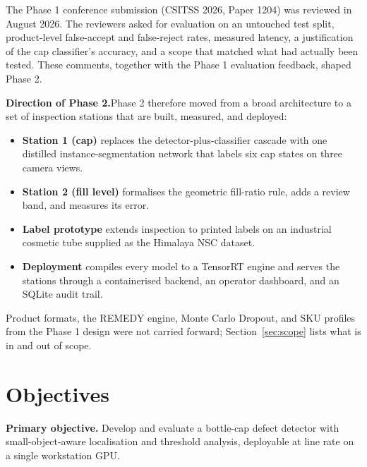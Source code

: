 The Phase 1 conference submission (CSITSS 2026, Paper 1204) was reviewed in August 2026. The reviewers asked for evaluation on an untouched test split, product-level false-accept and false-reject rates, measured latency, a justification of the cap classifier's accuracy, and a scope that matched what had actually been tested. These comments, together with the Phase 1 evaluation feedback, shaped Phase 2.

\noindent\textbf{Direction of Phase 2.}Phase 2 therefore moved from a broad architecture to a set of inspection stations that are built, measured, and deployed:
\begin{itemize}
    \item \textbf{Station 1 (cap)} replaces the detector-plus-classifier cascade with one distilled instance-segmentation network that labels six cap states on three camera views.
    \item \textbf{Station 2 (fill level)} formalises the geometric fill-ratio rule, adds a review band, and measures its error.
    \item \textbf{Label prototype} extends inspection to printed labels on an industrial cosmetic tube supplied as the Himalaya NSC dataset.
    \item \textbf{Deployment} compiles every model to a TensorRT engine and serves the stations through a containerised backend, an operator dashboard, and an SQLite audit trail.
\end{itemize}
Product formats, the REMEDY engine, Monte Carlo Dropout, and SKU profiles from the Phase 1 design were not carried forward; Section~\ref{sec:scope} lists what is in and out of scope.

\section{Objectives}
\label{sec:objectives}

\noindent\textbf{Primary objective.} Develop and evaluate a bottle-cap defect detector with small-object-aware localisation and threshold analysis, deployable at line rate on a single workstation GPU.

